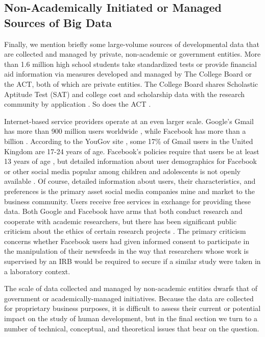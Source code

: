 \documentclass[letterpaper,man,apacite]{apa6}
\begin{document}
\subsection{Non-Academically Initiated or Managed Sources of Big Data}

Finally, we mention briefly some large-volume sources of developmental data that are collected and managed by private, non-academic or government entities.
More than 1.6 million high school students \cite{lewin_more_2013} take standardized tests or provide financial aid information via measures developed and managed by The College Board or the ACT, both of which are private entities.
The College Board shares Scholastic Aptitude Test (SAT) and college cost and scholarship data with the research community by application \cite{College_Board_data}.
So does the ACT \cite{ACT_research}.

Internet-based service providers operate at an even larger scale.
Google's Gmail has more than 900 million users worldwide \cite{lardinois_gmail_2015}, while Facebook has more than a billion \cite{facebook_2014}.
According to the YouGov site \cite{YouGov}, some 17\% of Gmail users in the United Kingdom are 17-24 years of age.
Facebook's policies require that users be at least 13 years of age \cite{facebook_under_13}, but detailed information about user demographics for Facebook or other social media popular among children and adolescents is not openly available \cite{BI_social_media}.
Of course, detailed information about users, their characteristics, and preferences is the primary asset social media companies mine and market to the business community.
Users receive free services in exchange for providing these data.
Both Google \cite{Google_Research} and Facebook \cite{Facebook_Research} have arms that both conduct research and cooperate with academic researchers, but there has been significant public criticism about the ethics of certain research projects \cite{meyer_everything_2014}.
The primary criticism concerns whether Facebook users had given informed consent to participate in the manipulation of their newsfeeds in the way that researchers whose work is supervised by an IRB would be required to secure if a similar study were taken in a laboratory context.

The scale of data collected and managed by non-academic entities dwarfs that of government or academically-managed initiatives.
Because the data are collected for proprietary business purposes, it is difficult to assess their current or potential impact on the study of human development, but in the final section we turn to a number of technical, conceptual, and theoretical issues that bear on the question.
\end{document}
